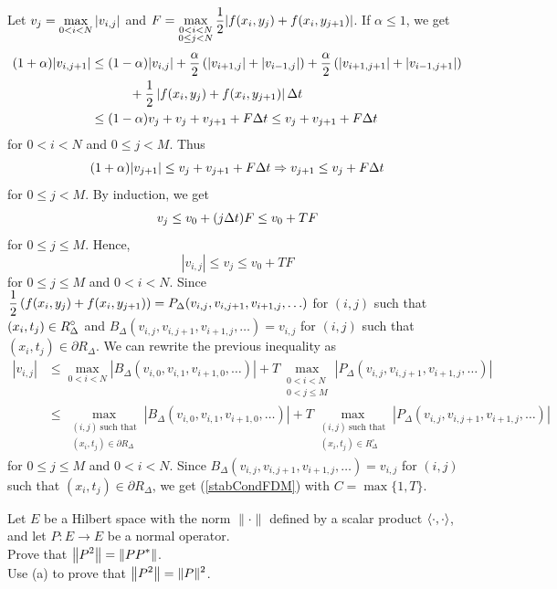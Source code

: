 {Let $\displaystyle v_j = \max_{0<i<N} |v_{i,j}|$ and
$\displaystyle F = \max_{\substack{0<i<N\\0\leq j<N}} \frac{1}{2}
  |f(x_i,y_j) + f(x_i,y_{j+1})|$.
If $\alpha \leq 1$, we get
\begin{align*}
(1 + \alpha) |v_{i,j+1}| &\leq (1-\alpha) |v_{i,j}|
+ \frac{\alpha}{2} \left( |v_{i+1,j}| + |v_{i-1,j}| \right)
+ \frac{\alpha}{2} \left( |v_{i+1,j+1}| + |v_{i-1,j+1}| \right) \\
& \qquad\quad + \frac{1}{2}\left| f(x_i,y_j) + f(x_i,y_{j+1})\right| \Delta{t} \\
& \leq (1-\alpha) v_j + v_j + v_{j+1} + F \Delta{t}
\leq v_j + v_{j+1} + F \Delta{t}
\end{align*}
for $0<i<N$ and $0\leq j < M$.  Thus
\[
(1 + \alpha) |v_{j+1}| \leq v_j + v_{j+1}  + F \Delta{t}
\Rightarrow
v_{j+1} \leq v_j + F \Delta{t}
\]
for $0\leq j < M$.  By induction, we get
\[
  v_j \leq v_0 + (j \Delta{t}) F \leq v_0 + T F 
\]
for $0\leq j \leq M$.  Hence,
\[
  |v_{i,j}| \leq v_j \leq v_0 + T F
\]
for $0\leq j \leq M$ and $0<i<N$.  Since
$\displaystyle \frac{1}{2}\left( f(x_i,y_j) + f(x_i,y_{j+1})\right)
= P_\Delta(v_{i,j},v_{i,j+1},v_{i+1,j},\ldots)$
for $(i,j)$ such that $\displaystyle (x_i,t_j) \in R_\Delta^\circ$
and $B_\Delta(v_{i,j},v_{i,j+1},v_{i+1,j},\ldots) = v_{i,j}$
for $(i,j)$ such that $(x_i,t_j) \in \partial R_\Delta$.  We can
rewrite the previous inequality as
\begin{align*}
|v_{i,j}| &\leq \max_{0<i<N}|B_\Delta(v_{i,0},v_{i,1},v_{i+1,0},\ldots)|
+ T \max_{\substack{0<i<N\\0<j\leq M}}|P_\Delta(v_{i,j},v_{i,j+1},v_{i+1,j},\ldots)|
\\
&\leq \max_{\substack{(i,j)\ \text{such that}\\(x_i,t_j) \in \partial R_\Delta}}
|B_\Delta(v_{i,0},v_{i,1},v_{i+1,0},\ldots)|
+ T \max_{\substack{(i,j)\ \text{such that}\\(x_i,t_j) \in R_\Delta^\circ}}
|P_\Delta(v_{i,j},v_{i,j+1},v_{i+1,j},\ldots)|
\end{align*}
for $0\leq j \leq M$ and $0<i<N$.  Since
$B_\Delta(v_{i,j},v_{i,j+1},v_{i+1,j},\ldots) = v_{i,j}$ for $(i,j)$
such that $(x_i,t_j) \in \partial R_\Delta$, we get 
(\ref{stabCondFDM}) with $C = \max \{1, T\}$.
}

\begin{question}
Let $E$ be a Hilbert space with the norm
$\|\cdot\|$ defined by a scalar product $\left\langle{\cdot} , {\cdot}\right\rangle$, and let
$P:E \to E$ be a normal operator.\\
 Prove that
$\displaystyle \left\|P^2 \right\| = \left\|P P^\ast\right\|$. \\
 Use (a) to prove that $\displaystyle \left\|P^2 \right\| = \|P\|^2$.
\label{fdmQ2}
\end{question}

